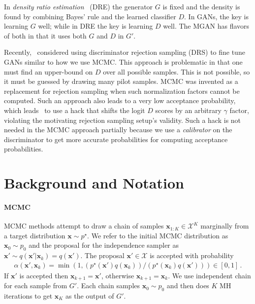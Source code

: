 \documentclass{article}
\renewcommand{\vec}[1]{{\boldsymbol{\mathbf{#1}}}} %
\newcommand{\set}[1]{\mathcal{#1}}
\newcommand{\sample}{\sim}
\newcommand{\given}{|}
\newcommand{\target}{{p^\star}}
\newcommand{\prop}{q}
\newcommand{\pinit}{{p_0}}
\newcommand{\accept}{\alpha}
\newcommand{\setx}{\set{X}}
\begin{document}
In \emph{density ratio estimation}~\citep{Sugiyama2012} (DRE) the generator $G$ is fixed and the density is found by combining Bayes' rule and the learned classifier $D$.
In GANs, the key is learning $G$ well; while in DRE the key is learning $D$ well.
The MGAN has flavors of both in that it uses both $G$ and $D$ in $G'$.

Recently,~\citet{Azadi2018} considered using discriminator rejection sampling (DRS) to fine tune GANs similar to how we use MCMC\@.
This approach is problematic in that one must find an upper-bound on $D$ over all possible samples.
This is not possible, so it must be guessed by drawing many pilot samples.
MCMC was invented as a replacement for rejection sampling when such normalization factors cannot be computed.
Such an approach also leads to a very low acceptance probability, which leads~\citet{Azadi2018} to use a hack that shifts the logit $D$ scores by an arbitrary $\gamma$ factor, violating the motivating rejection sampling setup's validity.
Such a hack is not needed in the MCMC approach partially because we use a \emph{calibrator} on the discriminator to get more accurate probabilities for computing acceptance probabilities.

\section{Background and Notation}
\label{sec:Background}

\paragraph{MCMC}
MCMC methods attempt to draw a chain of samples $\vec x_{1:K} \in \setx^K$ marginally from a target distribution $\vec x \sample \target$.
We refer to the initial MCMC distribution as $\vec x_0 \sample \pinit$ and the proposal for the independence sampler as $\vec x' \sample \prop(\vec x' \given \vec x_k)=\prop(\vec x')$.
The proposal $\vec x' \in \setx$ is accepted with probability
\begin{align}
  \accept(\vec x', \vec x_k) = \min\left(1, (\target(\vec x')\prop(\vec x_k))/(\target(\vec x_k)\prop(\vec x'))\right) \in [0,1]\,. \label{eq:alpha def}
\end{align}
If $\vec x'$ is accepted then $\vec x_{k+1} = \vec x'$, otherwise $\vec x_{k+1} = \vec x_k$.
We use independent chain for each sample from $G'$.
Each chain samples $\vec x_0 \sample \pinit$ and then does $K$ MH iterations to get $\vec x_K$ as the output of $G'$.
\end{document}
